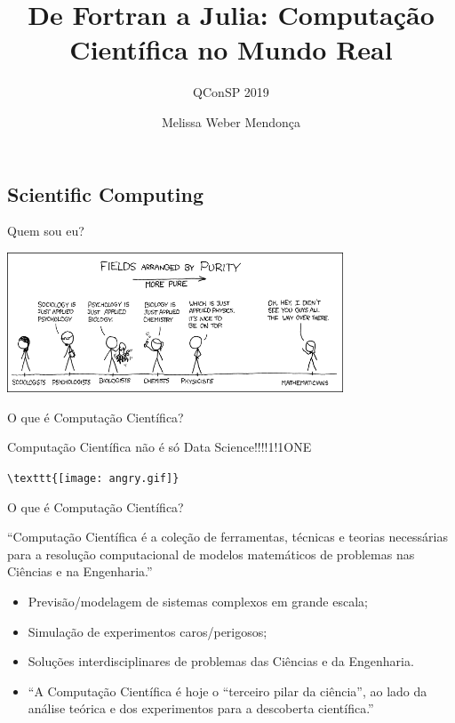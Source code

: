 \documentclass{beamer}
\title{De Fortran a Julia: Computação Científica no Mundo Real}
\subtitle{QConSP 2019}
\author{Melissa Weber Mendonça}
\begin{document}
\frame{\maketitle}

\begin{darkframes}
  \section{Scientific Computing}
  
  \begin{frame}{Quem sou eu?}
    \begin{center}
      \includegraphics[width=10cm]{figures/purity.png}
    \end{center}
  \end{frame}
  
  \begin{frame}[fragile]{O que é Computação Científica?}
    \begin{center}
      \alert{Computação Científica não é só Data Science!!!!1!1ONE}
    \end{center}
    \vfill
    \begin{center}
      \verb+\texttt{[image: angry.gif]}+
    \end{center}
  \end{frame}
  
  \begin{frame}{O que é Computação Científica?}
    \begin{block}{}
      ``Computação Científica é a coleção de ferramentas, técnicas e teorias necessárias para a resolução computacional de modelos matemáticos de problemas nas Ciências e na Engenharia.'' \cite{GolubOrtega}
    \end{block}
    \begin{itemize}
    \item<2-> Previsão/modelagem de sistemas complexos em grande escala;
    \item<3-> Simulação de experimentos caros/perigosos;
    \item<4-> Soluções interdisciplinares de problemas das Ciências e da Engenharia.
    \item<5> ``A Computação Científica é hoje o “terceiro pilar da ciência”, ao lado da análise teórica e dos experimentos para a descoberta científica.'' \cite{TUKweb}
    \end{itemize}
  \end{frame}


\end{darkframes}
\end{document}
